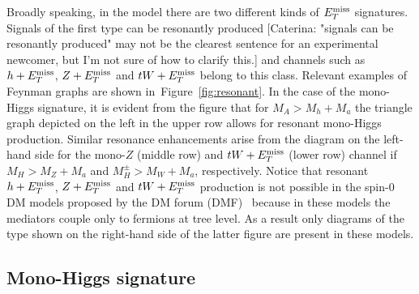 Broadly speaking, in the  \hdma model there are two different kinds of $E_T^\mathrm{miss}$ signatures. Signals of the first type can be resonantly produced \color{red}[Caterina: "signals can be resonantly produced" may not be the clearest sentence for an experimental newcomer, but I'm not sure of how to clarify this.]\color{black} and  channels such as $h+E_T^\mathrm{miss}$, $Z+ E_T^\mathrm{miss}$ and $tW+E_T^\mathrm{miss}$ belong to this class. Relevant examples of Feynman graphs are shown in~Figure~\ref{fig:resonant}. In the case of the mono-Higgs signature, it is evident from the figure that for $M_A > M_h + M_a$ the triangle  graph depicted on the left in the upper row  allows for resonant mono-Higgs production.  Similar resonance enhancements arise from the diagram on the left-hand side for the mono-$Z$ (middle row) and $tW+E_T^\mathrm{miss}$ (lower row) channel if $M_H > M_Z + M_a$ and $M_H^\pm > M_W + M_a$, respectively. Notice that resonant $h+E_T^\mathrm{miss}$, $Z+E_T^\mathrm{miss}$ and $tW+E_T^\mathrm{miss}$ production is not possible in the spin-0  DM models proposed by the DM forum (DMF)~\cite{Abercrombie:2015wmb} because in these models the mediators couple only to fermions at tree level. As a result only diagrams of the type shown on the right-hand side of the latter figure are present in  these models. 

\subsection*{Mono-Higgs signature}


